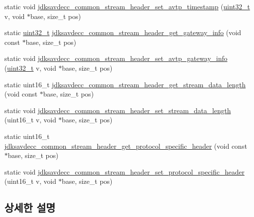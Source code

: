 \begin{DoxyCompactItemize}
\item 
static void \hyperlink{group__jdksavdecc__avtp__common__stream__header_gacf9ca4a068775c3a1b7ed6a59d0c40c4}{jdksavdecc\+\_\+common\+\_\+stream\+\_\+header\+\_\+set\+\_\+avtp\+\_\+timestamp} (\hyperlink{parse_8c_a6eb1e68cc391dd753bc8ce896dbb8315}{uint32\+\_\+t} v, void $\ast$base, size\+\_\+t pos)
\item 
static \hyperlink{parse_8c_a6eb1e68cc391dd753bc8ce896dbb8315}{uint32\+\_\+t} \hyperlink{group__jdksavdecc__avtp__common__stream__header_gad76bbc0ce29346ee5830370a6288dfb0}{jdksavdecc\+\_\+common\+\_\+stream\+\_\+header\+\_\+get\+\_\+gateway\+\_\+info} (void const $\ast$base, size\+\_\+t pos)
\item 
static void \hyperlink{group__jdksavdecc__avtp__common__stream__header_ga29477f66db4267040deed8a4aae3cb8a}{jdksavdecc\+\_\+common\+\_\+stream\+\_\+header\+\_\+set\+\_\+avtp\+\_\+gateway\+\_\+info} (\hyperlink{parse_8c_a6eb1e68cc391dd753bc8ce896dbb8315}{uint32\+\_\+t} v, void $\ast$base, size\+\_\+t pos)
\item 
static uint16\+\_\+t \hyperlink{group__jdksavdecc__avtp__common__stream__header_ga1457308e7d42adb713a5f130497c9153}{jdksavdecc\+\_\+common\+\_\+stream\+\_\+header\+\_\+get\+\_\+stream\+\_\+data\+\_\+length} (void const $\ast$base, size\+\_\+t pos)
\item 
static void \hyperlink{group__jdksavdecc__avtp__common__stream__header_ga544d07912745431ebec15343c72d9a04}{jdksavdecc\+\_\+common\+\_\+stream\+\_\+header\+\_\+set\+\_\+stream\+\_\+data\+\_\+length} (uint16\+\_\+t v, void $\ast$base, size\+\_\+t pos)
\item 
static uint16\+\_\+t \hyperlink{group__jdksavdecc__avtp__common__stream__header_ga1c1c9e3403005799cc13be253a2fd91f}{jdksavdecc\+\_\+common\+\_\+stream\+\_\+header\+\_\+get\+\_\+protocol\+\_\+specific\+\_\+header} (void const $\ast$base, size\+\_\+t pos)
\item 
static void \hyperlink{group__jdksavdecc__avtp__common__stream__header_ga29d14dda055e77b78919b61ee1c84a6e}{jdksavdecc\+\_\+common\+\_\+stream\+\_\+header\+\_\+set\+\_\+protocol\+\_\+specific\+\_\+header} (uint16\+\_\+t v, void $\ast$base, size\+\_\+t pos)
\end{DoxyCompactItemize}


\subsection{상세한 설명}


